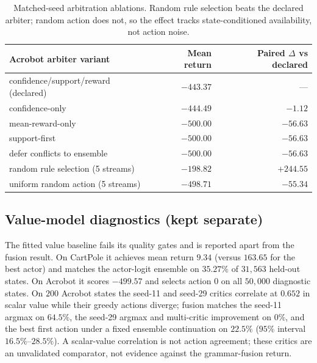 \documentclass[11pt]{article}
\begin{document}
\begin{table}[t]
\centering\small
\begin{tabular}{@{}lrr@{}}
\toprule
Acrobot arbiter variant & Mean return & Paired $\Delta$ vs declared \\
\midrule
confidence/support/reward (declared) & $-443.37$ & --- \\
confidence-only                      & $-444.49$ & $-1.12$ \\
mean-reward-only                     & $-500.00$ & $-56.63$ \\
support-first                        & $-500.00$ & $-56.63$ \\
defer conflicts to ensemble          & $-500.00$ & $-56.63$ \\
random rule selection (5 streams)    & $-198.82$ & $+244.55$ \\
uniform random action (5 streams)    & $-498.71$ & $-55.34$ \\
\bottomrule
\end{tabular}
\caption{Matched-seed arbitration ablations. Random rule selection beats the declared arbiter;
random action does not, so the effect tracks state-conditioned availability, not action noise.}
\label{tab:arb}
\end{table}

\subsection{Value-model diagnostics (kept separate)}
The fitted value baseline fails its quality gates and is reported apart from the fusion result. On
CartPole it achieves mean return $9.34$ (versus $163.65$ for the best actor) and matches the
actor-logit ensemble on $35.27\%$ of $31{,}563$ held-out states. On Acrobot it scores $-499.57$
and selects action $0$ on all $50{,}000$ diagnostic states. On $200$ Acrobot states the seed-11 and
seed-29 critics correlate at $0.652$ in scalar value while their greedy actions diverge; fusion
matches the seed-11 argmax on $64.5\%$, the seed-29 argmax and multi-critic improvement on $0\%$,
and the best first action under a fixed ensemble continuation on $22.5\%$ ($95\%$ interval
$16.5\%$--$28.5\%$). A scalar-value correlation is not action agreement; these critics are an
unvalidated comparator, not evidence against the grammar-fusion return.
\end{document}
